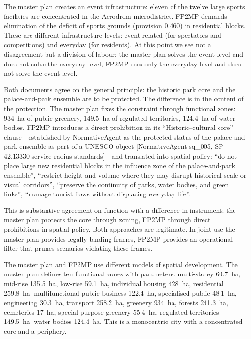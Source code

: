 The master plan creates an event infrastructure: eleven of the twelve large sports facilities are concentrated in the Aerodrom microdistrict. FP2MP demands elimination of the deficit of sports grounds (provision 0.460) in residential blocks. These are different infrastructure levels: event-related (for spectators and competitions) and everyday (for residents). At this point we see not a disagreement but a division of labour: the master plan solves the event level and does not solve the everyday level, FP2MP sees only the everyday level and does not solve the event level.
 
Both documents agree on the general principle: the historic park core and the palace-and-park ensemble are to be protected. The difference is in the content of the protection. The master plan fixes the constraint through functional zones: 934~ha of public greenery, 149.5~ha of regulated territories, 124.4~ha of water bodies. FP2MP introduces a direct prohibition in its ``Historic--cultural core'' clause---established by NormativeAgent as the protected status of the palace-and-park ensemble as part of a UNESCO object [NormativeAgent sq\_005, SP 42.13330 service radius standards]---and translated into spatial policy: ``do not place large new residential blocks in the influence zone of the palace-and-park ensemble'', ``restrict height and volume where they may disrupt historical scale or visual corridors'', ``preserve the continuity of parks, water bodies, and green links'', ``manage tourist flows without displacing everyday life''.
 
This is substantive agreement on function with a difference in instrument: the master plan protects the core through zoning, FP2MP through direct prohibitions in spatial policy. Both approaches are legitimate. In joint use the master plan provides legally binding frames, FP2MP provides an operational filter that prunes scenarios violating these frames.
 
The master plan and FP2MP use different models of spatial development. The master plan defines ten functional zones with parameters: multi-storey 60.7~ha, mid-rise 135.5~ha, low-rise 59.1~ha, individual housing 428~ha, residential 259.8~ha, multifunctional public-business 122.4~ha, specialised public 48.1~ha, engineering 30.3~ha, transport 258.2~ha, greenery 934~ha, forests 241.3~ha, cemeteries 17~ha, special-purpose greenery 55.4~ha, regulated territories 149.5~ha, water bodies 124.4~ha. This is a monocentric city with a concentrated core and a periphery.
 
